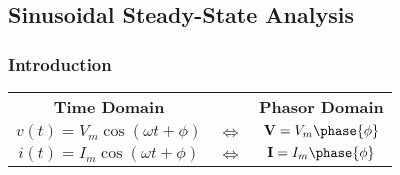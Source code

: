 \subsection{Sinusoidal Steady-State Analysis}%
\label{sub:sinusoidal-steady-state-analysis}

\subsubsection{Introduction}

\begin{multicols}{2}

    \begin{CheatsheetEntryFrame}


        \newcommand{\X}{\hphantom{x}} %
        \begin{tabularx}{\textwidth}{ccC}
            {\scriptsize \textbf{Time Domain}}   &                             & {\scriptsize \textbf{Phasor Domain}} \\
            \X $v(t) = V_m \cos{(\omega t + \phi)}$ \X & $\Longleftrightarrow$ & $\mathbf{V} = V_m \phase{\phi}$      \\
            \X $i(t) = I_m \cos{(\omega t + \phi)}$ \X & $\Longleftrightarrow$ & $\mathbf{I} = I_m \phase{\phi}$      \\
        \end{tabularx}



\end{CheatsheetEntryFrame}
\end{multicols}
